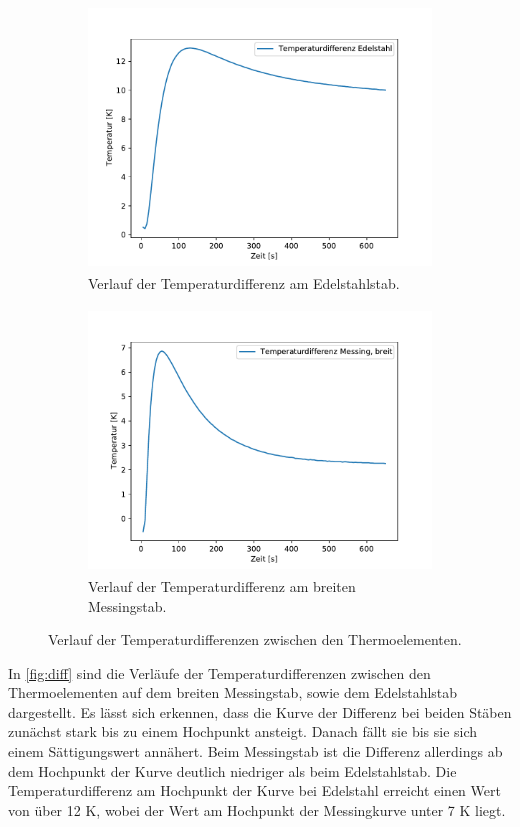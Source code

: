 \begin{figure}[H]
  \begin{subfigure}{\textwidth}
  \centering
  \includegraphics[height=7cm]{content/differenz_edel.pdf}
  \caption{Verlauf der Temperaturdifferenz am Edelstahlstab.}
  \label{fig:diff_edel}
\end{subfigure}
\begin{subfigure}{\textwidth}
  \centering
  \includegraphics[height=7cm]{content/differenz_mess.pdf}
  \caption{Verlauf der Temperaturdifferenz am breiten Messingstab.}
  \label{fig:diff_mess}
\end{subfigure}
\caption{Verlauf der Temperaturdifferenzen zwischen den Thermoelementen.}
\label{fig:diff}
\end{figure}

\noindent In \autoref{fig:diff} sind die Verläufe der Temperaturdifferenzen zwischen den Thermoelementen auf dem breiten Messingstab, sowie dem Edelstahlstab dargestellt.
Es lässt sich erkennen, dass die Kurve der Differenz bei beiden Stäben zunächst stark bis zu einem Hochpunkt ansteigt. Danach fällt sie bis sie sich einem Sättigungswert annähert.
Beim Messingstab ist die Differenz allerdings ab dem Hochpunkt der Kurve deutlich niedriger als beim Edelstahlstab.
Die Temperaturdifferenz am Hochpunkt der Kurve bei Edelstahl erreicht einen Wert von über 12 K, wobei der Wert am Hochpunkt der Messingkurve unter 7 K liegt.

